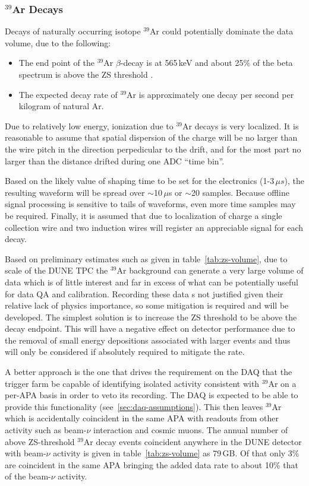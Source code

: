 \subsubsection{$^{39}$Ar Decays}
\label{sec:ar39decays}
Decays of naturally occurring isotope $^{39}$Ar could potentially dominate the data volume,
due to the following:
\begin{itemize}
\item The end point of the $^{39}$Ar $\beta$-decay is at 565\,keV and about
25\% of the beta spectrum is above the ZS threshold \cite{ar39endpoint}.

\item The expected decay rate of $^{39}$Ar is approximately one decay per second per kilogram of natural Ar\cite{ar39bkg}.
\end{itemize}
\noindent
Due to relatively low energy, ionization due to $^{39}$Ar decays is very localized.
It is reasonable to assume that spatial dispersion of the charge will be no larger than the wire pitch
in the direction perpedicular to the drift, and for the most part no larger than the distance drifted
during one ADC ``time bin''.

Based on the likely value of shaping time to be set for the electronics (1-3\,${\mu}s$),
the resulting waveform will be spread over $\sim$10\,$\mu$s or $\sim$20 samples. Because offline signal
processing is sensitive to tails of waveforms, even more time samples may be required.
Finally, it is assumed that due to localization of charge a single collection wire and two induction
wires will register an appreciable signal for each decay.

Based on preliminary estimates such as given in table~\ref{tab:zs-volume},
due to scale of the DUNE TPC the $^{39}$Ar background can generate a very large volume
of data which is of little interest and far in excess of what can be potentially useful for data QA and
calibration. Recording these data s not justified given their relative lack
of physics importance, so some mitigation is required and will be developed. The simplest solution
is to increase the ZS threshold to be above the decay endpoint.
This will have a negative effect on detector performance due to the removal of small energy
depositions associated with larger events and thus will only be
considered if absolutely required to mitigate the rate.

A better approach is the one that drives the requirement on the DAQ
that the trigger farm be capable of identifying isolated activity
consistent with $^{39}$Ar on a per-APA basis in order to veto its
recording. The DAQ is expected to be able to provide this functionality
(see~\ref{sec:daq-assumptions}).
This then leaves $^{39}$Ar which is accidentally coincident in the
same APA with readouts from other activity such as beam-$\nu$
interaction and cosmic muons.
The annual number of above ZS-threshold $^{39}$Ar decay events
coincident anywhere in the DUNE detector with beam-$\nu$ activity is
given in table~\ref{tab:zs-volume} as 79\,GB. Of that only 3\% are coincident
in the same APA bringing the added data rate to about 10\% that of the beam-$\nu$ activity.

